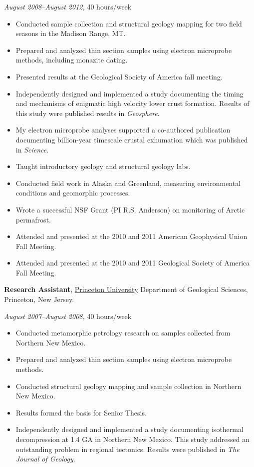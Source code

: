 \documentclass[10pt]{article}
\begin{document}
\textit{August 2008--August 2012,} 40 hours/week 

\begin{itemize}
\item Conducted sample collection and structural geology mapping for two field seasons in the Madison Range, MT.
\item Prepared and analyzed thin section samples using electron microprobe methods, including monazite dating.
\item Presented results at the Geological Society of America fall meeting. 
\item Independently designed and implemented a study documenting the timing and mechanisms of enigmatic high velocity lower crust formation. Results of this study were published results in \textit{Geosphere}. 
\item My electron microprobe analyses supported a co-authored publication documenting billion-year timescale crustal exhumation which was published in \textit{Science}.
\item Taught introductory geology and structural geology labs.
\item Conducted field work in Alaska and Greenland, measuring environmental conditions and geomorphic processes.
\item Wrote a successful NSF Grant (PI R.S. Anderson) on monitoring of Arctic permafrost. 
\item Attended and presented at the 2010 and 2011 American Geophysical Union Fall Meeting.  
\item Attended and presented at the 2010 and 2011 Geological Society of America Fall Meeting. 
\end{itemize} 

\textbf{Research Assistant}, \href{https://geosciences.princeton.edu/}{{Princeton University}} Department of Geological Sciences, Princeton, New Jersey.

\textit{August 2007--August 2008,}  40 hours/week 

\begin{itemize}
\item Conducted metamorphic petrology research on samples collected from Northern New Mexico.
\item Prepared and analyzed thin section samples using electron microprobe methods.
\item Conducted structural geology mapping and sample collection in Northern New Mexico.
\item Results formed the basis for Senior Thesis.
\item Independently designed and implemented a study documenting isothermal decompression at 1.4 GA in Northern New Mexico. This study addressed an outstanding problem in regional tectonics. Results were published in \textit{The Journal of Geology}.
\end{itemize} 
\end{document}
